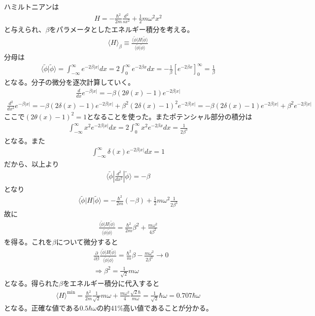 \documentclass{jlreq}
\begin{document}
ハミルトニアンは
\begin{align}
    H=-\frac{\hbar^2}{2m}\frac{d^2}{sx^2}+\frac{1}{2}m\omega^2x^2
\end{align}
と与えられ、$\beta$をパラメータとしたエネルギー積分を考える。
\begin{align}
    \langle H\rangle_\beta\equiv\frac{\langle\tilde{\phi}|H|\tilde{\phi}\rangle}{\langle\tilde{\phi}|\tilde{\phi}\rangle}
\end{align}
分母は
\begin{align}
    \langle\tilde{\phi}|\tilde{\phi}\rangle=\int^\infty_{-\infty}e^{-2\beta|x|} dx=2\int^\infty_{0}e^{-2\beta x} dx = -\frac{1}{\beta}[e^{-2\beta x}]^\infty_0=\frac{1}{\beta}
\end{align}
となる。分子の微分を逐次計算していく。
\begin{align}
    \frac{d}{dx}e^{-\beta |x|}=-\beta (2\theta(x)-1)e^{-2\beta |x|}
\end{align}
\begin{align}
    \frac{d^2}{dx^2}e^{-\beta |x|}=-\beta (2\delta(x)-1)e^{-2\beta |x|}+\beta^2 (2\delta(x)-1)^2 e^{-2\beta |x|}=-\beta (2\delta(x)-1)e^{-2\beta |x|}+\beta^2 e^{-2\beta |x|}
\end{align} 
ここで$(2\theta(x)-1)^2=1$となることを使った。またポテンシャル部分の積分は
\begin{align}
    \int^\infty_{-\infty} x^2 e^{-2\beta|x|}dx=2\int^{\infty}_0 x^2 e^{-2\beta x}dx=\frac{1}{2\beta^3}
\end{align}
となる。また
\begin{align}
    \int^\infty_{-\infty} \delta(x) e^{-2\beta|x|}dx=1
\end{align}
だから、以上より
\begin{align}
    \langle\tilde{\phi}|\frac{d^2}{dx^2}|\tilde{\phi}\rangle=-\beta
\end{align}
となり
\begin{align}
    \langle\tilde{\phi}|H|\tilde{\phi}\rangle=-\frac{\hbar^2}{2m}(-\beta)+\frac{1}{2}m\omega^2\frac{1}{2\beta^3}
\end{align}
故に
\begin{align}
    \frac{\langle\tilde{\phi}|H|\tilde{\phi}\rangle}{\langle\tilde{\phi}|\tilde{\phi}\rangle}=\frac{\hbar^2}{2m}\beta^2+\frac{m\omega^2}{4\beta^2}
\end{align}
を得る。これを$\beta$について微分すると
\begin{align}
    &\frac{\partial}{\partial\beta}\frac{\langle\tilde{\phi}|H|\tilde{\phi}\rangle}{\langle\tilde{\phi}|\tilde{\phi}\rangle}=\frac{\hbar^2}{m}\beta-\frac{m\omega^2}{2\beta^3}\rightarrow 0 \\
    &\Rightarrow \beta^2=\frac{1}{\sqrt{2}}m\omega
\end{align}
となる。得られた$\beta$をエネルギー積分に代入すると
\begin{align}
    \langle H\rangle^\text{min}=\frac{\hbar^2}{2m}\frac{1}{\sqrt{2}}m\omega+\frac{m\omega^2}{4} \frac{\sqrt{2}\hbar}{m\omega}=\frac{1}{\sqrt{2}}\hbar\omega=0.707\hbar\omega
\end{align}
となる。正確な値である$0.5\hbar\omega$の約41\%高い値であることが分かる。
\end{document}
